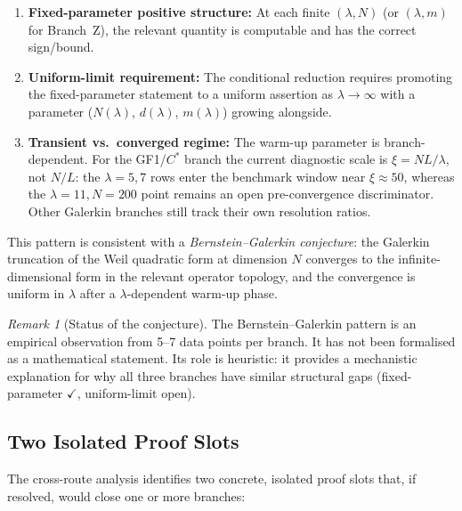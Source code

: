 \documentclass[12pt,a4paper]{article}
\theoremstyle{definition}
\theoremstyle{remark}
\newtheorem{remark}[theorem]{Remark}
\begin{document}
\begin{enumerate}
  \item \textbf{Fixed-parameter positive structure:} At each finite
    $(\lambda, N)$ (or $(\lambda, m)$ for Branch~Z), the relevant
    quantity is computable and has the correct sign/bound.
  \item \textbf{Uniform-limit requirement:} The conditional reduction
    requires promoting the fixed-parameter statement to a uniform
    assertion as $\lambda \to \infty$ with a parameter
    ($N(\lambda)$, $d(\lambda)$, $m(\lambda)$) growing alongside.
  \item \textbf{Transient vs.\ converged regime:} The warm-up parameter is
    branch-dependent. For the GF1/$C^*$ branch the current diagnostic scale is
    $\xi=NL/\lambda$, not $N/L$: the $\lambda=5,7$ rows enter the benchmark
    window near $\xi\approx 50$, whereas the $\lambda=11,N=200$ point remains
    an open pre-convergence discriminator. Other Galerkin branches still track
    their own resolution ratios.
\end{enumerate}

This pattern is consistent with a \emph{Bernstein--Galerkin conjecture}:
the Galerkin truncation of the Weil quadratic form at dimension $N$
converges to the infinite-dimensional form in the relevant operator
topology, and the convergence is uniform in $\lambda$ after a
$\lambda$-dependent warm-up phase.

\begin{remark}[Status of the conjecture]
The Bernstein--Galerkin pattern is an empirical observation from
5--7 data points per branch. It has not been formalised as a
mathematical statement. Its role is heuristic: it provides a
mechanistic explanation for why all three branches have similar
structural gaps (fixed-parameter $\checkmark$, uniform-limit open).
\end{remark}


\subsection{Two Isolated Proof Slots}

The cross-route analysis identifies two concrete, isolated proof slots
that, if resolved, would close one or more branches:
\end{document}
